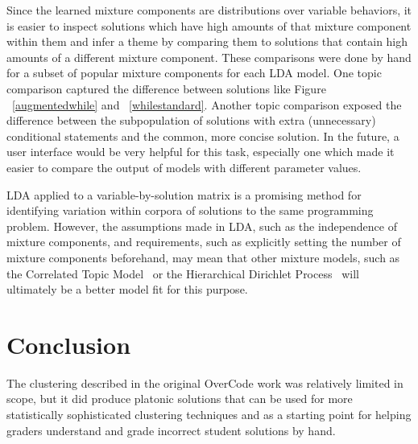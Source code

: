 Since the learned mixture components are distributions over variable behaviors, it is easier to inspect solutions which have high amounts of that mixture component within them and infer a theme by comparing them to solutions that contain high amounts of a different mixture component. These comparisons were done by hand for a subset of popular mixture components for each LDA model. One topic comparison captured the difference between solutions like Figure ~\ref{augmentedwhile} and ~\ref{whilestandard}. Another topic comparison exposed the difference between the subpopulation of solutions with extra (unnecessary) conditional statements and the common, more concise solution. In the future, a user interface would be very helpful for this task, especially one which made it easier to compare the output of models with different parameter values. 

LDA applied to a variable-by-solution matrix is a promising method for identifying variation within corpora of solutions to the same programming problem. However, the assumptions made in LDA, such as the independence of mixture components, and requirements, such as explicitly setting the number of mixture components beforehand, may mean that other mixture models, such as the Correlated Topic Model~\cite{} or the Hierarchical Dirichlet Process~\cite{} will ultimately be a better model fit for this purpose.



\section{Conclusion}
The clustering described in the original OverCode work was relatively limited in scope, but it did produce platonic solutions that can be used for more statistically sophisticated clustering techniques and as a starting point for helping graders understand and grade incorrect student solutions by hand.

